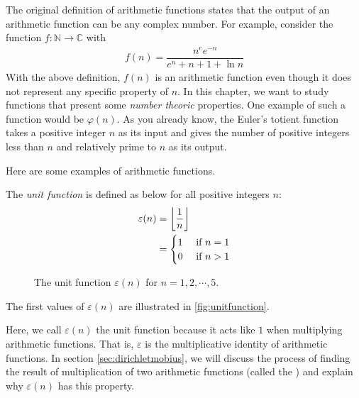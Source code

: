 	\begin{remark}
		The original definition of arithmetic functions states that the output of an arithmetic function can be any complex number. For example, consider the function $f:\mathbb{N}\to \mathbb{C}$ with
			\begin{align*}
				f(n)=\dfrac{n^ee^{-n}}{e^n+n+1+\ln n}
			\end{align*}
		With the above definition, $f(n)$ is an arithmetic function even though it does not represent any specific property of $n$. In this chapter, we want to study functions that present some \textit{number theoric} properties. One example of such a function would be $\varphi(n)$. As you already know, the Euler's totient function takes a positive integer $n$ as its input and gives the number of positive integers less than $n$ and relatively prime to $n$ as its output.
	\end{remark}
Here are some examples of arithmetic functions.
	\begin{definition}
		The \textit{unit function} is defined as below for all positive integers $n$:
			\begin{align*}
				\varepsilon(n)
					& =\left\lfloor{\dfrac 1n}\right\rfloor\\
					& =\begin{cases}1&\mbox{ if }n=1\\0&\mbox{ if }n>1\end{cases}
			\end{align*}

		\begin{figure}
		\centering
		\caption{The unit function $\varepsilon(n)$ for $n=1,2,\cdots,5$.}
		\label{fig:unitfunction}
	\end{figure}
		The first values of $\varepsilon(n)$ are illustrated in \autoref{fig:unitfunction}.
	\end{definition}

	\begin{note}
		Here, we call $\varepsilon(n)$ the unit function because it acts like $1$ when multiplying arithmetic functions. That is, $\varepsilon$ is the multiplicative identity of arithmetic functions. In section \ref{sec:dirichletmobius}, we will discuss the process of finding the result of multiplication of two arithmetic functions (called the ) and explain why $\varepsilon(n)$ has this property.
	\end{note}


